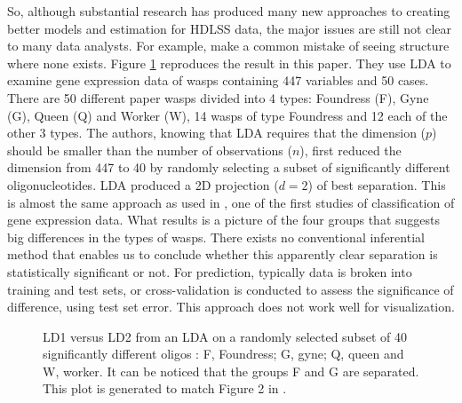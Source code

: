 So, although substantial research has produced many new approaches to creating better models and estimation for HDLSS data, the major issues are still not clear to many data analysts. For example, \cite{toth:2010} make a common mistake of seeing structure where none exists. Figure \ref{oligo} reproduces the result in this paper.  They use LDA to examine gene expression data of wasps containing 447 variables and 50 cases. There are 50 different paper wasps divided into 4 types: Foundress (F), Gyne (G), Queen (Q) and Worker (W), 14  wasps of type Foundress and 12 each of the other 3 types. The authors, knowing that LDA requires that the dimension ($p$) should be smaller than the number of observations ($n$), first reduced the dimension from 447 to 40 by randomly selecting a subset of significantly different oligonucleotides. LDA produced a 2D projection ($d=2$) of best separation. This is almost the same approach as used in \cite{dudoit:2002}, one of the first studies of classification of gene expression data. What results is a picture of the four groups that suggests big differences in the types of wasps. There exists no conventional inferential method that enables us to conclude whether this apparently clear separation is statistically significant or not. For prediction, typically data is broken into training and test sets, or cross-validation is conducted to assess the significance of difference, using test set error. This approach does not work well for visualization.

\begin{figure}[hbtp]
   \centering
       \caption{LD1 versus LD2 from an LDA on a randomly selected subset of 40 significantly different oligos : F, Foundress; G, gyne; Q, queen and W, worker. It can be noticed that the groups F and G are separated. This plot is generated to match Figure 2 in \cite{toth:2010}. }
     \label{oligo}
\end{figure}  

